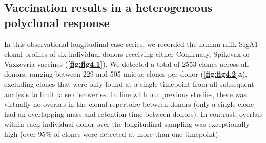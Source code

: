 \subsection{Vaccination results in a heterogeneous polyclonal response}
In this observational longitudinal case series, we recorded the human milk SIgA1 clonal profiles of six individual donors receiving either Comirnaty, Spikevax or Vaxzevria vaccines (\textbf{\autoref{fig:fig4.1}}). We detected a total of 2553 clones across all donors, ranging between 229 and 505 unique clones per donor (\textbf{\autoref{fig:fig4.2}a}), excluding clones that were only found at a single timepoint from all subsequent analysis to limit false discoveries. In line with our previous studies, there was virtually no overlap in the clonal repertoire between donors (only a single clone had an overlapping mass and retention time between donors). In contrast, overlap within each individual donor over the longitudinal sampling was exceptionally high (over 95\% of clones were detected at more than one timepoint).\\
